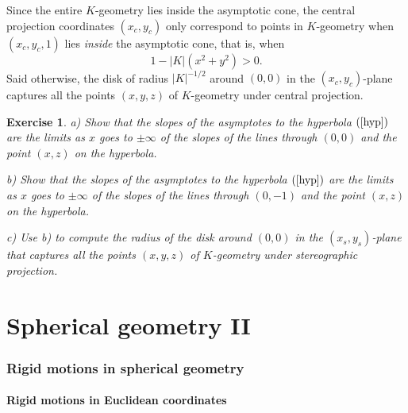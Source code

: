 \documentclass{article}%
\newtheorem{exercise}[theorem]{Exercise}
\begin{document}
Since the entire $K$-geometry lies inside the asymptotic cone, the central
projection coordinates $\left(  x_{c},y_{c}\right)  $ only correspond to
points in $K$-geometry when $\left(  x_{c},y_{c},1\right)  $ lies
\textit{inside} the asymptotic cone, that is, when%
\[
1-\left\vert K\right\vert \left(  x^{2}+y^{2}\right)  >0.
\]
Said otherwise, the disk of radius $\left\vert K\right\vert ^{-1/2}$ around
$\left(  0,0\right)  $ in the $\left(  x_{c},y_{c}\right)  $-plane captures
all the points $\left(  x,y,z\right)  $ of $K$-geometry under central projection.

\begin{exercise}
a) Show that the slopes of the asymptotes to the hyperbola $\left(
\ref{hyp}\right)  $ are the limits as $x$ goes to $\pm\infty$ of the slopes of
the lines through $\left(  0,0\right)  $ and the point $\left(  x,z\right)  $
on the hyperbola.

b) Show that the slopes of the asymptotes to the hyperbola $\left(
\ref{hyp}\right)  $ are the limits as $x$ goes to $\pm\infty$ of the slopes of
the lines through $\left(  0,-1\right)  $ and the point $\left(  x,z\right)  $
on the hyperbola.

c) Use b) to compute the radius of the disk around $\left(  0,0\right)  $ in
the $\left(  x_{s},y_{s}\right)  $-plane that captures all the points $\left(
x,y,z\right)  $ of $K$-geometry under stereographic projection.\pagebreak\ 
\end{exercise}

\part{Spherical geometry II\label{V}}

\section{Rigid motions in spherical geometry}

\subsection{Rigid motions in Euclidean coordinates}
\end{document}
